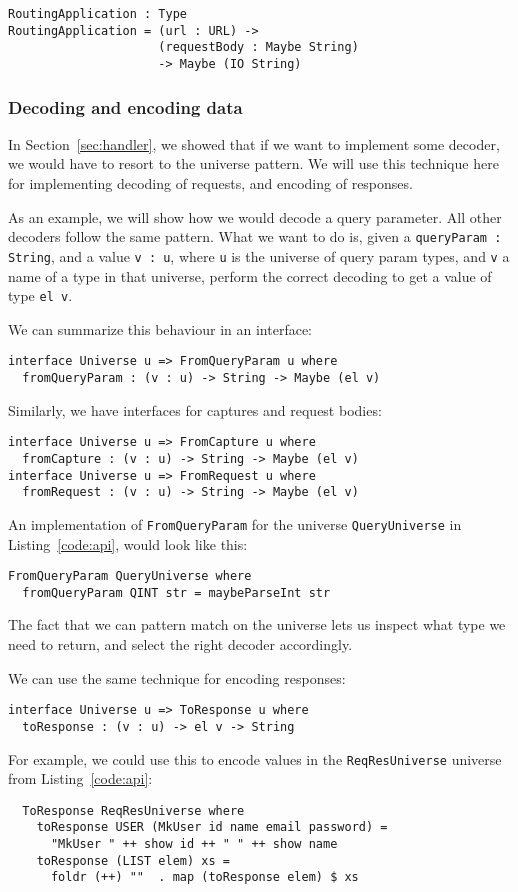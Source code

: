 \documentclass[12pt,a4paper]{article}
\begin{document}
\begin{verbatim}
RoutingApplication : Type
RoutingApplication = (url : URL) ->
                     (requestBody : Maybe String)
                     -> Maybe (IO String)
\end{verbatim}

\subsubsection{Decoding and encoding data}
In Section~\ref{sec:handler}, we showed that if we want to implement some decoder, we would have to resort to the universe pattern. We will use this technique here for implementing decoding of requests, and encoding of responses. 

As an example, we will show how we would decode a query parameter. All other decoders follow the same pattern.
What we want to do is, given a \texttt{queryParam : String}, and a value \texttt{v : u},
where \texttt{u} is the universe of query param types, and  \texttt{v} a name of a type in that universe,
perform the correct decoding to get a value of type \texttt{el v}.

We can summarize this behaviour in an interface:
\begin{verbatim}
interface Universe u => FromQueryParam u where
  fromQueryParam : (v : u) -> String -> Maybe (el v)
\end{verbatim}
Similarly, we have interfaces for captures and request bodies:
\begin{verbatim}
interface Universe u => FromCapture u where
  fromCapture : (v : u) -> String -> Maybe (el v)
interface Universe u => FromRequest u where
  fromRequest : (v : u) -> String -> Maybe (el v)
\end{verbatim}
An implementation of \texttt{FromQueryParam} for the universe \texttt{QueryUniverse} in Listing~\ref{code:api}, would look like this:
\begin{verbatim}
FromQueryParam QueryUniverse where
  fromQueryParam QINT str = maybeParseInt str
\end{verbatim}
The fact that we can pattern match on the universe lets us inspect what type we need to return, and select the right decoder accordingly.


We can use the same technique for encoding responses:
\begin{verbatim}
interface Universe u => ToResponse u where
  toResponse : (v : u) -> el v -> String
\end{verbatim}
For example, we could use this to encode values in the \texttt{ReqResUniverse} universe from
Listing~\ref{code:api}:
\begin{verbatim}
  ToResponse ReqResUniverse where
    toResponse USER (MkUser id name email password) =
      "MkUser " ++ show id ++ " " ++ show name
    toResponse (LIST elem) xs =
      foldr (++) ""  . map (toResponse elem) $ xs
\end{verbatim}
\end{document}
